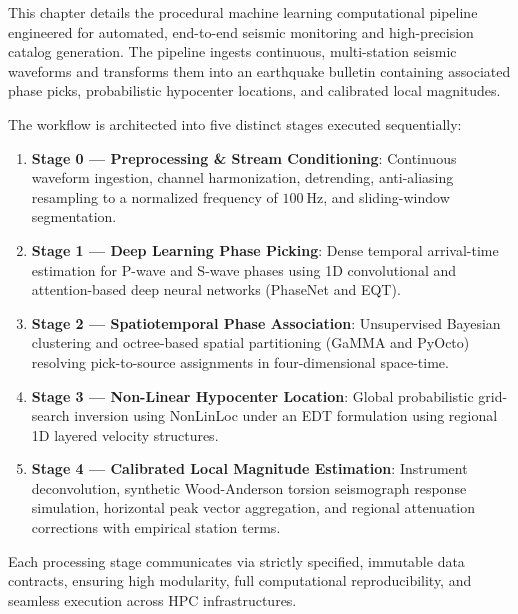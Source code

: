 
\label{chap:computational_pipeline}

This chapter details the procedural machine learning computational
pipeline engineered for automated, end-to-end seismic monitoring and
high-precision catalog generation. The pipeline ingests continuous,
multi-station seismic waveforms and transforms them into an
earthquake bulletin containing associated phase picks, probabilistic
hypocenter locations, and calibrated local magnitudes.

The workflow is architected into five distinct stages executed sequentially:
\begin{enumerate}
  \item \textbf{Stage 0 --- Preprocessing \& Stream Conditioning}:
    Continuous waveform ingestion, channel harmonization,
    detrending, anti-aliasing resampling to a normalized frequency
    of $\qty{100}{\hertz}$, and sliding-window segmentation.
  \item \textbf{Stage 1 --- Deep Learning Phase Picking}: Dense
    temporal arrival-time estimation for P-wave and S-wave phases
    using 1D convolutional and attention-based deep neural networks
    (\ac{PhaseNet} and \ac{EQT}).
  \item \textbf{Stage 2 --- Spatiotemporal Phase Association}:
    Unsupervised Bayesian clustering and octree-based spatial
    partitioning (\ac{GaMMA} and \ac{PyOcto}) resolving pick-to-source
    assignments in four-dimensional space-time.
  \item \textbf{Stage 3 --- Non-Linear Hypocenter Location}: Global
    probabilistic grid-search inversion using \ac{NonLinLoc} under an
    \ac{EDT} formulation using regional 1D layered velocity structures.
  \item \textbf{Stage 4 --- Calibrated Local Magnitude Estimation}:
    Instrument deconvolution, synthetic Wood-Anderson torsion
    seismograph response simulation, horizontal peak vector
    aggregation, and regional attenuation corrections with empirical
    station terms.
\end{enumerate}

Each processing stage communicates via strictly specified, immutable
data contracts, ensuring high modularity, full computational
reproducibility, and seamless execution across \ac{HPC} infrastructures.

